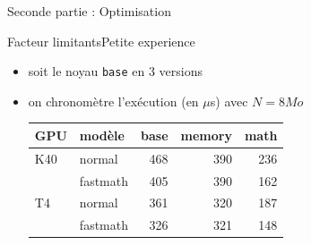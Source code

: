 \documentclass[11pt,mathserif]{beamer}
\begin{document}
\begin{frame}
  \begin{center}
    {\Huge Seconde partie : Optimisation}
  \end{center}
\end{frame}

\begin{frame}{Facteur limitants}{Petite experience}
  \begin{itemize}[<+->]
    \item soit le noyau \texttt{base} en 3 versions
      
    \item on chronomètre l'exécution (en $\mu$s) avec $N=8Mo$ 
    \begin{minipage}[l]{0.49\linewidth}
      \begin{center}
        \begin{tabular}{|l |l|r|r|r|}
          \hline
          GPU & modèle    & base    & memory & math  \\ 
          \hline
          K40 &normal    &  468    &  390   &  236\\ 
              &fastmath  &  405    &  390   &  162 \\ 
          \hline
          T4 & normal    &  361    &  320   &  187\\ 
             & fastmath  &  326    &  321   &  148 \\ 
          \hline
        \end{tabular}
      \end{center}
    \end{minipage}
  \end{itemize}
\end{frame}
\end{document}
